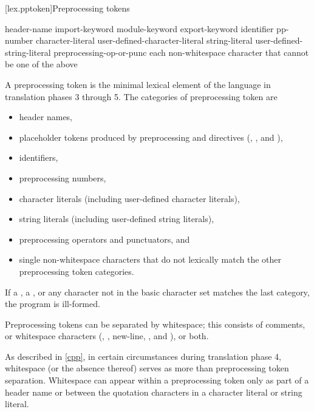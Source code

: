[lex.pptoken]{Preprocessing tokens}

%
\begin{bnf}
\br
    header-name\br
    import-keyword\br
    module-keyword\br
    export-keyword\br
    identifier\br
    pp-number\br
    character-literal\br
    user-defined-character-literal\br
    string-literal\br
    user-defined-string-literal\br
    preprocessing-op-or-punc\br
    \textnormal{each non-whitespace character that cannot be one of the above}
\end{bnf}

\pnum
A preprocessing token is the minimal lexical element of the language in translation
phases 3 through 5.
The categories of preprocessing token are
\begin{itemize}
\item
header names,
\item
placeholder tokens produced by preprocessing 
and  directives
(, ,
and ),
\item
identifiers,
\item
preprocessing numbers,
\item
character literals (including user-defined character literals),
\item
string literals (including user-defined string literals),
\item
preprocessing operators and punctuators, and
\item
single non-whitespace characters that do not lexically
match the other preprocessing token categories.
\end{itemize}
If a , a ,
or any character not in the basic character set
matches the last category, the program is ill-formed.

\pnum
Preprocessing tokens can be separated by
%
whitespace;
%
this consists of comments, or whitespace characters
(,
,
new-line,
, and
), or both.
\begin{note}
As described in \ref{cpp}, in certain
circumstances during translation phase 4, whitespace (or the absence
thereof) serves as more than preprocessing token separation. Whitespace
can appear within a preprocessing token only as part of a header name or
between the quotation characters in a character literal or
string literal.
\end{note}

